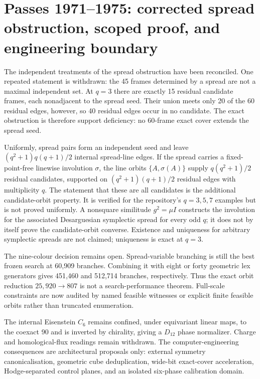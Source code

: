 \section*{Passes 1971--1975: corrected spread obstruction, scoped proof, and engineering boundary}
The independent treatments of the spread obstruction have been reconciled. One
repeated statement is withdrawn: the 45 frames determined by a spread are not a
maximal independent set. At $q=3$ there are exactly 15 residual candidate
frames, each nonadjacent to the spread seed. Their union meets only 20 of the 60
residual edges, however, so 40 residual edges occur in no candidate. The exact
obstruction is therefore support deficiency: no 60-frame exact cover extends the
spread seed.

Uniformly, spread pairs form an independent seed and leave
$(q^2+1)q(q+1)/2$ internal spread-line edges. If the spread carries a
fixed-point-free linewise involution $\sigma$, the line orbits
$\{A,\sigma(A)\}$ supply $q(q^2+1)/2$ residual candidates, supported on
$(q^2+1)(q+1)/2$ residual edges with multiplicity $q$. The statement that these
are all candidates is the additional candidate-orbit property. It is verified
for the repository's $q=3,5,7$ examples but is not proved uniformly. A
nonsquare similitude $g^2=\mu I$ constructs the involution for the associated
Desarguesian symplectic spread for every odd $q$; it does not by itself prove the
candidate-orbit converse. Existence and uniqueness for arbitrary symplectic
spreads are not claimed; uniqueness is exact at $q=3$.

The nine-colour decision remains open. Spread-variable branching is still the
best frozen search at 60,909 branches. Combining it with eight or forty
geometric lex generators gives 451,460 and 512,714 branches, respectively.
Thus the exact orbit reduction $25{,}920\to807$ is not a search-performance
theorem. Full-scale constraints are now audited by named feasible witnesses or
explicit finite feasible orbits rather than truncated enumeration.

The internal Eisenstein $C_6$ remains confined, under equivariant linear maps,
to the coexact 90 and is inverted by chirality, giving a $D_{12}$ phase
normalizer. Charge and homological-flux readings remain withdrawn. The
computer-engineering consequences are architectural proposals only: external
symmetry canonicalisation, geometric cube deduplication, wide-bit exact-cover
acceleration, Hodge-separated control planes, and an isolated six-phase
calibration domain.
